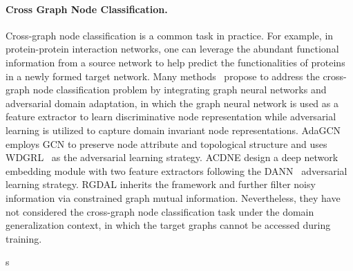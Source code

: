 \paragraph{Cross Graph Node Classification.}
Cross-graph node classification is a common task in practice. For example, in protein-protein interaction networks, one can leverage the abundant functional information from a source network to help predict the functionalities of proteins in a newly formed target network.
Many methods~\cite{dai2022graph,shen2020adversarial,yang2022robust} propose to address the cross-graph node classification problem by integrating graph neural networks and adversarial domain adaptation, in which the graph neural network is used as a feature extractor to learn discriminative node representation while adversarial learning is utilized to capture domain invariant node representations. AdaGCN\cite{dai2022graph} employs GCN\cite{kipf2017semi} to preserve node attribute and topological structure and uses WDGRL~\cite{shen2018wasserstein} as the adversarial learning strategy. ACDNE\cite{shen2020adversarial} design a deep network embedding module with two feature extractors following the DANN~\cite{ganin2016domain} adversarial learning strategy. RGDAL\cite{yang2022robust} inherits the framework and further filter noisy information via constrained graph mutual information. Nevertheless, they have not considered the cross-graph node classification task under the domain generalization context, in which the target graphs cannot be accessed during training.


s


